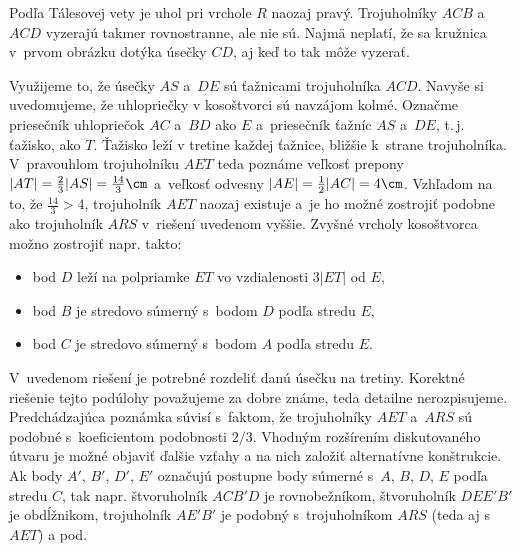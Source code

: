 {\noindent
Podľa Tálesovej vety je uhol pri vrchole $R$ naozaj pravý.
Trojuholníky $ACB$ a~$ACD$ vyzerajú takmer rovnostranne, ale nie sú.
Najmä neplatí, že sa kružnica v~prvom obrázku dotýka úsečky $CD$, aj keď to tak môže vyzerať.

\ineriesenie
Využijeme to, že úsečky $AS$ a~$DE$ sú ťažnicami trojuholníka $ACD$.
Navyše si uvedomujeme, že uhlopriečky v kosoštvorci sú navzájom kolmé.
Označme priesečník uhlopriečok $AC$ a~$BD$ ako $E$ a~priesečník ťažníc $AS$ a~$DE$, t.\,j. ťažisko, ako $T$.
Ťažisko leží v tretine každej ťažnice, bližšie k~strane trojuholníka.
V~pravouhlom trojuholníku $AET$ teda poznáme veľkosť prepony $|AT|=\frac23|AS|=\frac{14}3\cm$ a~veľkosť odvesny $|AE|=\frac12|AC|=4\cm$.
Vzhľadom na to, že $\frac{14}3>4$, trojuholník $AET$ naozaj existuje a~je ho možné zostrojiť podobne ako trojuholník $ARS$ v~riešení uvedenom vyššie.
Zvyšné vrcholy kosoštvorca možno zostrojiť napr. takto:
\begin{itemize}
\item bod $D$ leží na polpriamke $ET$ vo vzdialenosti $3|ET|$ od $E$,
\item bod $B$ je stredovo súmerný s~bodom $D$ podľa stredu $E$,
\item bod $C$ je stredovo súmerný s~bodom $A$ podľa stredu $E$.
%
\end{itemize}

\poznamky
V~uvedenom riešení je potrebné rozdeliť danú úsečku na tretiny.
Korektné riešenie tejto podúlohy považujeme za dobre známe, teda detailne nerozpisujeme.
Predchádzajúca poznámka súvisí s~faktom, že trojuholníky $AET$ a~$ARS$ sú podobné s~koeficientom podobnosti $2/3$.
Vhodným rozšírením diskutovaného útvaru je možné objaviť ďalšie vzťahy a na nich založiť alternatívne konštrukcie.
Ak body $A'$, $B'$, $D'$, $E'$ označujú postupne body súmerné s~$A$, $B$, $D$, $E$ podľa stredu $C$, tak napr.
štvoruholník $ACB'D$ je rovnobežníkom,
štvoruholník $DEE'B'$ je obdĺžnikom,
trojuholník $AE'B'$ je podobný s~trojuholníkom $ARS$ (teda aj s~$AET$)
a pod.
%
}

